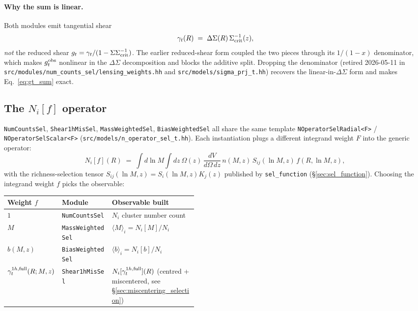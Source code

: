 \documentclass[a4paper, 11pt]{article}
\newcommand{\modname}[1]{\textcolor{kwcol}{\texttt{#1}}}
\newcommand{\pyfile}[1]{{\small\texttt{#1}}}
\begin{document}
\paragraph{Why the sum is linear.}  Both modules emit tangential shear
\begin{equation}
  \gamma_t(R) \;=\; \Delta\Sigma(R)\,\Sigma_{\rm crit}^{-1}(z),
\end{equation}
\emph{not} the reduced shear $g_t = \gamma_t/(1 - \Sigma \Sigma_{\rm crit}^{-1})$.
The earlier reduced-shear form coupled the two pieces through its
$1/(1-x)$ denominator, which makes $g_t^{\rm obs}$ nonlinear in the
$\Delta\Sigma$ decomposition and blocks the additive split.  Dropping
the denominator (retired 2026-05-11 in
\pyfile{src/modules/num\_counts\_sel/lensing\_weights.hh} and
\pyfile{src/models/sigma\_prj\_t.hh}) recovers the linear-in-$\Delta\Sigma$
form and makes Eq.~\eqref{eq:gt_sum} exact.

\subsection{The $N_i[f]$ operator}

\modname{NumCountsSel}, \modname{Shear1hMisSel},
\modname{MassWeightedSel}, \modname{BiasWeightedSel} all share the
same template \texttt{NOperatorSelRadial<F>} /
\texttt{NOperatorSelScalar<F>}
(\pyfile{src/models/n\_operator\_sel\_t.hh}).  Each instantiation
plugs a different integrand weight $F$ into the generic operator:
\begin{equation}
\label{eq:n_op}
  N_i[f](R)
  \;=\; \int d\ln M \int dz\
    \Omega(z)\,\frac{dV}{d\Omega\,dz}\,n(M, z)\,
    S_{ij}(\ln M, z)\,f(R, \ln M, z),
\end{equation}
with the richness-selection tensor $S_{ij}(\ln M, z) = S_i(\ln M, z)
K_j(z)$ published by \modname{sel\_function} (\S\ref{sec:sel_function}).
Choosing the integrand weight $f$ picks the observable:
\begin{center}
\small
\begin{tabular}{@{}l l p{0.45\linewidth}@{}}
\toprule
Weight $f$                     & Module                       & Observable built                                  \\
\midrule
$1$                            & \modname{NumCountsSel}       & $N_i$ cluster number count                        \\
$M$                            & \modname{MassWeightedSel}    & $\langle M\rangle_i = N_i[M]/N_i$                 \\
$b(M, z)$                      & \modname{BiasWeightedSel}    & $\langle b\rangle_i = N_i[b]/N_i$                 \\
$\gamma_t^{1h, {\rm full}}(R; M, z)$ & \modname{Shear1hMisSel} & $N_i[\gamma_t^{1h, {\rm full}}](R)$ (centred + miscentered, see \S\ref{sec:miscentering_selection}) \\
\bottomrule
\end{tabular}
\end{center}
\end{document}
